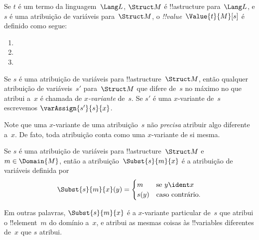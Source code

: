 \documentclass[../../../include/open-logic-section]{subfiles}
\begin{document}
\begin{defn}
Se $t$ é um termo da linguagem~$\Lang L$, $\Struct M$ é
!!a{structure} para~$\Lang L$, e $s$ é uma atribuição de variáveis
para~$\Struct M$, o \emph{!!{value}}~$\Value{t}{M}[s]$ é definido como
segue:
\begin{enumerate}
\item {}
\item {}
\item {}
\end{enumerate}
\end{defn}

\begin{defn}[$x$-Variante]
Se $s$ é uma atribuição de variáveis para !!a{structure}~$\Struct M$, então qualquer
atribuição de variáveis~$s'$ para~$\Struct M$ que difere de~$s$ no máximo
no que atribui a~$x$ é chamada de \emph{$x$-variante} de~$s$.  Se
$s'$ é uma $x$-variante de~$s$ escrevemos $\varAssign{s'}{s}{x}$.
\end{defn}

\begin{explain}
Note que uma $x$-variante de uma atribuição~$s$ não \emph{precisa}
atribuir algo diferente a~$x$.  De fato, toda atribuição conta
como uma $x$-variante de si mesma.
\end{explain}

\begin{defn}
  Se $s$ é uma atribuição de variáveis para !!a{structure}~$\Struct M$
  e $m \in \Domain{M}$, então a atribuição~$\Subst{s}{m}{x}$ é a
  atribuição de variáveis definida por
  \[\Subst{s}{m}{x}(y) = \begin{cases}
    m & \text{se } y \ident x\\
    s(y) & \text{caso contrário}.
  \end{cases}\]
\end{defn}

Em outras palavras, $\Subst{s}{m}{x}$ é a $x$-variante particular de~$s$
que atribui o !!{element}~$m$ do domínio a~$x$, e atribui as mesmas
coisas às !!{variable}s diferentes de~$x$ que $s$ atribui.
\end{document}
